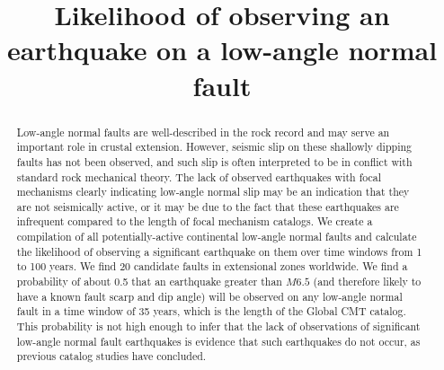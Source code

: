 \documentclass[twocolumn,grl]{AGUTeX}
\begin{document}
\title{Likelihood of observing an earthquake on a low-angle normal fault}



\begin{abstract}
Low-angle normal faults are well-described in the rock record and may serve
an important role in crustal extension.  However, seismic slip on these
shallowly dipping faults  has not been observed, and such slip is often 
interpreted to be in conflict with standard rock mechanical theory.
The lack of observed earthquakes with focal mechanisms clearly 
indicating low-angle normal slip may be an
indication that they are not seismically active, or it may be due to the fact
that these earthquakes are infrequent compared to the length of 
focal mechanism catalogs.   
We create a compilation of all potentially-active continental low-angle normal
faults and calculate the likelihood of observing a significant earthquake on 
them over time windows from 1 to 100 years. We find 20 candidate faults in
extensional zones worldwide.  We find a probability of about 0.5 that an
earthquake greater than $M6.5$ (and therefore likely to have a known fault
scarp and dip angle) will be observed on any low-angle normal fault 
in a time window of 35 years, which is the length of the Global CMT catalog.
This probability is not high enough to infer that the
lack of observations of significant low-angle normal fault earthquakes is
evidence that such earthquakes do not occur, as previous catalog studies
have concluded.

\end{abstract}
\end{document}
